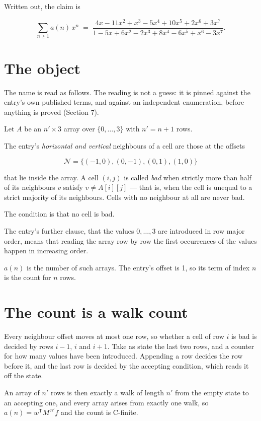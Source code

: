 \documentclass[11pt]{article}
\theoremstyle{definition}
\begin{document}
Written out, the claim is

\[\sum_{n \ge 1} a(n)\,x^n \;=\; \frac{4x - 11x^{2} + x^{3} - 5x^{4} + 10x^{5} + 2x^{6} + 3x^{7}}{1 - 5x + 6x^{2} - 2x^{3} + 8x^{4} - 6x^{5} + x^{6} - 3x^{7}}.\]

\section{The object}

The name is read as follows. The reading is not a guess: it is pinned against the entry's own published terms, and against an independent enumeration, before anything is proved (Section 7).

Let $A$ be an $n' \times 3$ array over $\{0,\dots,3\}$ with $n' = n + 1$ rows.

The entry's {\itshape horizontal and vertical} neighbours of a cell are those at the offsets

\[\mathcal{N} = \{(-1,0), (0,-1), (0,1), (1,0)\}\]

that lie inside the array. A cell $(i,j)$ is called {\itshape bad} when strictly more than half of its neighbours $v$ satisfy $v \ne A[i][j]$ --- that is, when the cell is unequal to a strict majority of its neighbours. Cells with no neighbour at all are never bad.

The condition is that no cell is bad.

The entry's further clause, that the values $0,\dots,3$ are introduced in row major order, means that reading the array row by row the first occurrences of the values happen in increasing order.

$a(n)$ is the number of such arrays. The entry's offset is 1, so its term of index $n$ is the count for $n$ rows.

\section{The count is a walk count}

Every neighbour offset moves at most one row, so whether a cell of row $i$ is bad is decided by rows $i-1$, $i$ and $i+1$. Take as state the last two rows, and a counter for how many values have been introduced. Appending a row decides the row before it, and the last row is decided by the accepting condition, which reads it off the state.

An array of $n'$ rows is then exactly a walk of length $n'$ from the empty state to an accepting one, and every array arises from exactly one walk, so $a(n) = w^{\mathsf T}M^{\,n'}f$ and the count is C-finite.
\end{document}
